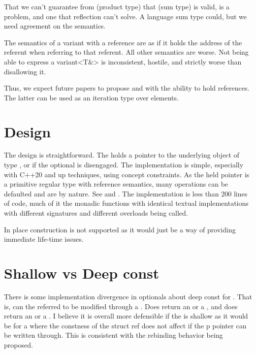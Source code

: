 \documentclass[a4paper,10pt,oneside,openany,final,article]{memoir}
\begin{document}
That we can't guarantee from  (product type) that  (sum type) is valid, is a problem, and one that reflection can't solve. A language sum type could, but we need agreement on the semantics.

The semantics of a variant with a reference are as if it holds the address of the referent when referring to that referent. All other semantics are worse. Not being able to express a variant<T\&> is inconsistent, hostile, and strictly worse than disallowing it.

Thus, we expect future papers to propose  and  with the ability to hold references.
The latter can be used as an iteration type over  elements.


\chapter{Design}

The design is straightforward. The  holds a pointer to the underlying object of type , or  if the optional is disengaged. The implementation is simple, especially with C++20 and up techniques, using concept constraints. As the held pointer is a primitive regular type with reference semantics, many operations can be defaulted and are  by nature. See \cite{Downey_smd_optional_optional_T} and \cite{rawgithu58:online}. The  implementation is less than 200 lines of code, much of it the monadic functions with identical textual implementations with different signatures and different overloads being called.

In place construction is not supported as it would just be a way of providing immediate life-time issues.

\chapter{Shallow vs Deep const}

There is some implementation divergence in optionals about deep const for . That is, can the referred to  be modified through a . Does  return an  or a , and does  return an  or a . I believe it is overall more defensible if the  is shallow as it would be for a  where the constness of the struct ref does not affect if the p pointer can be written through. This is consistent with the rebinding behavior being proposed.
\end{document}
